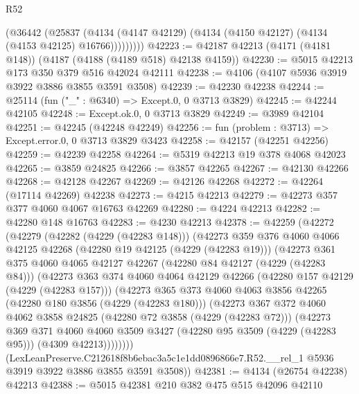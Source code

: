 \begin{lexlean}{R52}
\begin{coremodule}
            (@36442
              (@25837
                (@4134 (@4147 @42129) (@4134 (@4150 @42127) (@4134 (@4153 @42125) @16766)))))))))
@42223 := @42187 @42213 (@4171 (@4181 @148)) (@4187 (@4188 (@4189 @518) @42138 @4159))
@42230 := @5015 @42213 @173 @350 @379 @516 @42024 @42111
@42238 := @4106 (@4107 @5936 @3919 @3922 @3886 @3855 @3591 @3508)
@42239 := @42230 @42238
@42244 := @25114 (fun ("_" : @6340) => Except.{0, 0} @3713 @3829)
@42245 := @42244 @42105
@42248 := Except.ok.{0, 0} @3713 @3829
@42249 := @3989 @42104
@42251 := @42245 (@42248 @42249)
@42256 := fun (problem : @3713) => Except.error.{0, 0} @3713 @3829 @3423
@42258 := @42157 (@42251 @42256)
@42259 := @42239 @42258
@42264 := @5319 @42213 @19 @378 @4068 @42023
@42265 := @3859 @24825
@42266 := @3857 @42265
@42267 := @42130 @42266
@42268 := @42128 @42267
@42269 := @42126 @42268
@42272 := @42264 (@17114 @42269) @42238
@42273 := @4215 @42213
@42279 := @42273 @357 @377 @4060 @4067 @16763 @42269
@42280 := @4224 @42213
@42282 := @42280 @148 @16763
@42283 := @4230 @42213
@42378 := @42259
    (@42272
      (@42279
        (@42282 (@4229 (@42283 @148)))
        (@42273
          @359
          @376
          @4060
          @4066
          @42125
          @42268
          (@42280 @19 @42125 (@4229 (@42283 @19)))
          (@42273
            @361
            @375
            @4060
            @4065
            @42127
            @42267
            (@42280 @84 @42127 (@4229 (@42283 @84)))
            (@42273
              @363
              @374
              @4060
              @4064
              @42129
              @42266
              (@42280 @157 @42129 (@4229 (@42283 @157)))
              (@42273
                @365
                @373
                @4060
                @4063
                @3856
                @42265
                (@42280 @180 @3856 (@4229 (@42283 @180)))
                (@42273
                  @367
                  @372
                  @4060
                  @4062
                  @3858
                  @24825
                  (@42280 @72 @3858 (@4229 (@42283 @72)))
                  (@42273
                    @369
                    @371
                    @4060
                    @4060
                    @3509
                    @3427
                    (@42280 @95 @3509 (@4229 (@42283 @95)))
                    (@4309 @42213))))))))
      (LexLeanPreserve.C212618f8b6ebac3a5c1e1dd0896866e7.R52.__rel_1
        @5936
        @3919
        @3922
        @3886
        @3855
        @3591
        @3508))
@42381 := @4134 (@26754 @42238) @42213
@42388 := @5015 @42381 @210 @382 @475 @515 @42096 @42110

\end{coremodule}
\end{lexlean}
